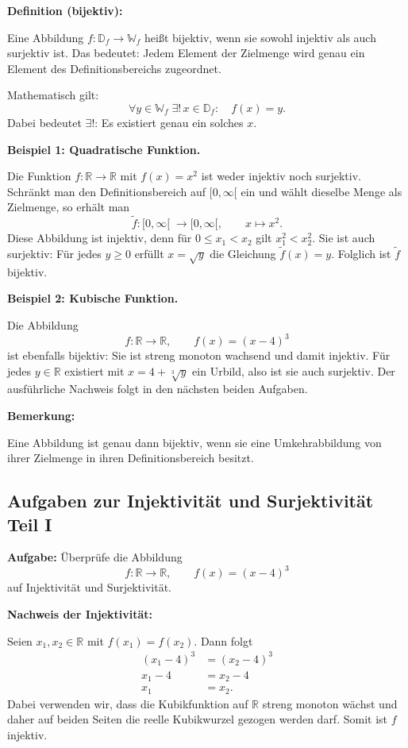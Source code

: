 \textbf{Definition (bijektiv):}

Eine Abbildung $f:\mathbb{D}_f\longrightarrow\mathbb{W}_f$
heißt bijektiv, wenn sie sowohl injektiv als auch
surjektiv ist. Das bedeutet: Jedem Element der
Zielmenge wird genau ein Element des Definitionsbereichs
zugeordnet.

Mathematisch gilt:
\[
\forall y\in\mathbb{W}_f\;\exists!\,x\in\mathbb{D}_f:
\quad f(x)=y.
\]
Dabei bedeutet $\exists!$: Es existiert genau ein solches $x$.

\textbf{Beispiel 1: Quadratische Funktion.}

Die Funktion $f:\mathbb{R}\rightarrow\mathbb{R}$ mit
$f(x)=x^2$ ist weder injektiv noch surjektiv.
Schränkt man den Definitionsbereich auf $[0,\infty[$ ein
und wählt dieselbe Menge als Zielmenge, so erhält man
\[
\widetilde f:[0,\infty[\;\longrightarrow[0,\infty[,
\qquad x\longmapsto x^2.
\]
Diese Abbildung ist injektiv, denn für
$0\le x_1<x_2$ gilt $x_1^2<x_2^2$.
Sie ist auch surjektiv: Für jedes $y\ge0$ erfüllt
$x=\sqrt{y}$ die Gleichung $\widetilde f(x)=y$.
Folglich ist $\widetilde f$ bijektiv.

\textbf{Beispiel 2: Kubische Funktion.}

Die Abbildung
\[
f:\mathbb{R}\longrightarrow\mathbb{R},
\qquad f(x)=(x-4)^3
\]
ist ebenfalls bijektiv: Sie ist streng monoton wachsend
und damit injektiv. Für jedes $y\in\mathbb{R}$ existiert
mit $x=4+\sqrt[3]{y}$ ein Urbild, also ist sie auch surjektiv.
Der ausführliche Nachweis folgt in den nächsten beiden Aufgaben.

\textbf{Bemerkung:}

Eine Abbildung ist genau dann bijektiv, wenn sie eine
Umkehrabbildung von ihrer Zielmenge in ihren Definitionsbereich
besitzt.

\subsection{Aufgaben zur Injektivität und Surjektivität Teil I}

\textbf{Aufgabe:} Überprüfe die Abbildung
\[
f:\mathbb{R}\longrightarrow\mathbb{R},\qquad f(x)=(x-4)^3
\]
auf Injektivität und Surjektivität.

\textbf{Nachweis der Injektivität:}

Seien $x_1,x_2\in\mathbb{R}$ mit $f(x_1)=f(x_2)$.
Dann folgt
\begin{align*}
(x_1-4)^3&=(x_2-4)^3\\
x_1-4&=x_2-4\\
x_1&=x_2.
\end{align*}
Dabei verwenden wir, dass die Kubikfunktion auf
$\mathbb{R}$ streng monoton wächst und daher
auf beiden Seiten die reelle Kubikwurzel gezogen
werden darf. Somit ist $f$ injektiv.

